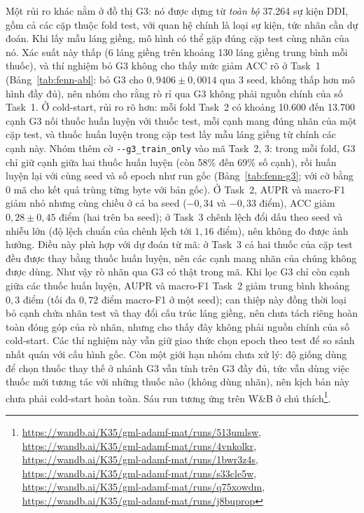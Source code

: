 \documentclass[conference]{IEEEtran}
\newcommand{\hlg}[1]{{\sethlcolor{hlgreen}\hl{#1}}}
\renewcommand{\hl}[1]{#1}
\begin{document}
Một rủi ro khác nằm ở đồ thị G3: nó được dựng từ \emph{toàn bộ} 37.264 sự kiện DDI, gồm cả các
cặp thuộc fold test, với quan hệ chính là loại sự kiện, tức nhãn cần dự đoán. Khi lấy mẫu láng
giềng, mô hình có thể gặp đúng cặp test cùng nhãn của nó. Xác suất này thấp (6 láng giềng trên
khoảng 130 láng giềng trung bình mỗi thuốc), và thí nghiệm bỏ G3 \hlg{không cho thấy mức giảm ACC rõ ở Task~1}
(Bảng~\ref{tab:fenn-abl}: bỏ G3 cho $0{,}9406\pm0{,}0014$ qua 3 seed, không thấp hơn mô hình đầy đủ), nên
nhóm cho rằng rò rỉ qua G3 không phải nguồn chính của số Task~1. Ở cold-start, rủi ro rõ hơn: mỗi
fold Task~2 có khoảng 10.600 đến 13.700 cạnh G3 nối thuốc huấn luyện với thuốc test, mỗi cạnh mang đúng
nhãn của một cặp test, và thuốc huấn luyện trong cặp test lấy mẫu láng giềng từ chính các cạnh này.
Nhóm thêm cờ \texttt{-{}-g3\_train\_only} vào mã Task~2, 3: trong mỗi fold, G3 chỉ giữ cạnh giữa hai
thuốc huấn luyện (còn 58\% đến 69\% số cạnh), rồi huấn luyện lại với cùng seed và số epoch như run gốc
(Bảng~\ref{tab:fenn-g3}; với cờ bằng $0$ mã cho kết quả trùng từng byte với bản gốc). Ở Task~2, AUPR
và macro-F1 giảm nhỏ nhưng cùng chiều ở cả ba seed ($-0{,}34$ và $-0{,}33$ điểm), ACC giảm $0{,}28 \pm
0{,}45$ điểm (hai trên ba seed); ở Task~3 chênh lệch đổi dấu theo seed và nhiễu lớn (độ lệch chuẩn
của chênh lệch tới $1{,}16$ điểm), nên không đo được ảnh hưởng. Điều này phù hợp với dự đoán từ mã:
ở Task~3 cả hai thuốc của cặp test đều được thay bằng thuốc huấn luyện, nên các cạnh mang nhãn của
chúng không được dùng. Như vậy rò nhãn qua G3 có thật trong mã. \hlg{Khi lọc G3 chỉ còn cạnh giữa các thuốc huấn luyện, AUPR và macro-F1 Task~2 giảm}
trung bình khoảng $0{,}3$ điểm (tối đa $0{,}72$ điểm macro-F1 ở một seed); \hlg{can thiệp này đồng thời loại bỏ cạnh chứa nhãn test và thay đổi cấu trúc láng giềng, nên chưa tách riêng hoàn toàn đóng góp của rò nhãn, nhưng cho thấy đây không phải nguồn chính của}
số cold-start. \hlg{Các thí nghiệm này vẫn giữ giao thức chọn epoch theo test để so sánh nhất quán với cấu hình gốc.} Còn một giới
hạn nhóm chưa xử lý: độ giống dùng để chọn thuốc thay thế ở nhánh G3 vẫn tính trên G3 đầy đủ, tức vẫn
dùng việc thuốc mới tương tác với những thuốc nào (không dùng nhãn), nên kịch bản này chưa phải
cold-start hoàn toàn. Sáu run tương ứng trên W\&B ở chú thích\footnote{\url{https://wandb.ai/K35/gml-adamf-mat/runs/513umlsw}, \url{https://wandb.ai/K35/gml-adamf-mat/runs/4vnkolkr}, \url{https://wandb.ai/K35/gml-adamf-mat/runs/1bwr3z4s}, \url{https://wandb.ai/K35/gml-adamf-mat/runs/s33cle5w}, \url{https://wandb.ai/K35/gml-adamf-mat/runs/q75xowdm}, \url{https://wandb.ai/K35/gml-adamf-mat/runs/j8buprop}}.
\end{document}
